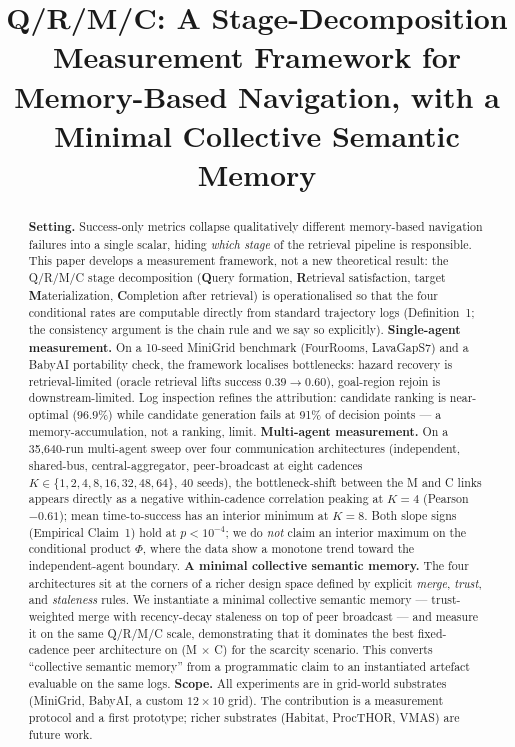 \documentclass{article}
\title{Q/R/M/C: A Stage-Decomposition Measurement Framework for Memory-Based Navigation, with a Minimal Collective Semantic Memory}
\begin{document}
\maketitle

\begin{abstract}
\textbf{Setting.} Success-only metrics collapse qualitatively different memory-based navigation failures into a single scalar, hiding \emph{which stage} of the retrieval pipeline is responsible. This paper develops a measurement framework, not a new theoretical result: the Q/R/M/C stage decomposition (\textbf{Q}uery formation, \textbf{R}etrieval satisfaction, target \textbf{M}aterialization, \textbf{C}ompletion after retrieval) is operationalised so that the four conditional rates are computable directly from standard trajectory logs (Definition~1; the consistency argument is the chain rule and we say so explicitly).
\textbf{Single-agent measurement.} On a 10-seed MiniGrid benchmark (FourRooms, LavaGapS7) and a BabyAI portability check, the framework localises bottlenecks: hazard recovery is retrieval-limited (oracle retrieval lifts success $0.39\to0.60$), goal-region rejoin is downstream-limited. Log inspection refines the attribution: candidate ranking is near-optimal ($96.9\%$) while candidate generation fails at 91\% of decision points --- a memory-accumulation, not a ranking, limit.
\textbf{Multi-agent measurement.} On a 35{,}640-run multi-agent sweep over four communication architectures (independent, shared-bus, central-aggregator, peer-broadcast at eight cadences $K{\in}\{1,2,4,8,16,32,48,64\}$, 40 seeds), the bottleneck-shift between the M and C links appears directly as a negative within-cadence correlation peaking at $K{=}4$ (Pearson $-0.61$); mean time-to-success has an interior minimum at $K{=}8$. Both slope signs (Empirical Claim~1) hold at $p<10^{-4}$; we do \emph{not} claim an interior maximum on the conditional product $\Phi$, where the data show a monotone trend toward the independent-agent boundary.
\textbf{A minimal collective semantic memory.} The four architectures sit at the corners of a richer design space defined by explicit \emph{merge}, \emph{trust}, and \emph{staleness} rules. We instantiate a minimal collective semantic memory --- trust-weighted merge with recency-decay staleness on top of peer broadcast --- and measure it on the same Q/R/M/C scale, demonstrating that it dominates the best fixed-cadence peer architecture on (M$\,\times\,$C) for the scarcity scenario. This converts ``collective semantic memory'' from a programmatic claim to an instantiated artefact evaluable on the same logs.
\textbf{Scope.} All experiments are in grid-world substrates (MiniGrid, BabyAI, a custom $12{\times}10$ grid). The contribution is a measurement protocol and a first prototype; richer substrates (Habitat, ProcTHOR, VMAS) are future work.
\end{abstract}
\end{document}
